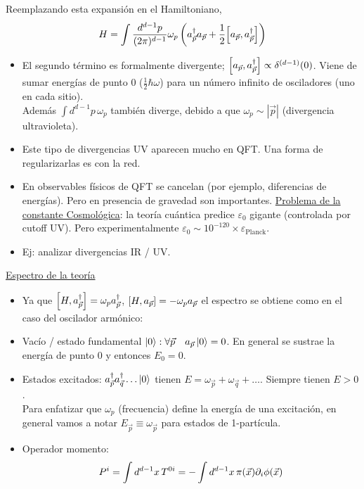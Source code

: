 Reemplazando esta expansión en el Hamiltoniano,
$$ H = \int \frac{d^{d-1}p}{(2\pi)^{d-1}} \omega_p \left( a_{\vec{p}}^\dagger a_{\vec{p}} + \frac{1}{2} \comm{a_{\vec{p}}}{a_{\vec{p}}^\dagger} \right) $$
\begin{itemize}
    \item El segundo término es formalmente divergente; $\comm{a_{\vec{p}}}{a_{\vec{p}}^\dagger} \propto \delta^{(d-1)}(0)$. Viene de sumar energías de punto 0 ($\frac{1}{2}\hbar\omega$) para un número infinito de osciladores (uno en cada sitio).\\
          Además $\int d^{d-1}p \, \omega_p$ también diverge, debido a que $\omega_p \sim |\vec{p}|$ (divergencia ultravioleta).
    \item[*] Este tipo de divergencias UV aparecen mucho en QFT. Una forma de regularizarlas es con la red.
    \item En observables físicos de QFT se cancelan (por ejemplo, diferencias de energías). Pero en presencia de gravedad son importantes. \underline{Problema de la constante Cosmológica}: la teoría cuántica predice $\varepsilon_0$ gigante (controlada por cutoff UV). Pero experimentalmente $\varepsilon_0 \sim 10^{-120} \times \varepsilon_{\text{Planck}}$.
    \item Ej: analizar divergencias IR / UV.
\end{itemize}

\vspace{0.5cm}
\noindent \underline{Espectro de la teoría}
\begin{itemize}
    \item Ya que $\comm{H}{a_{\vec{p}}^\dagger} = \omega_p a_{\vec{p}}^\dagger$, $\comm{H}{a_{\vec{p}}} = -\omega_p a_{\vec{p}}$ el espectro se obtiene como en el caso del oscilador armónico:
    \item[—] Vacío / estado fundamental $\ket{0} :\forall \vec{p}\quad a_{\vec{p}}\ket{0} = 0$. En general se sustrae la energía de punto 0 y entonces $E_0 = 0$.
    \item[—] Estados excitados: $a_{\vec{p}}^\dagger a_{\vec{q}}^\dagger \dots \ket{0}$ tienen $E = \omega_{\vec{p}} + \omega_{\vec{q}} + \dots$. Siempre tienen $E > 0$.\\
        Para enfatizar que $\omega_p$ (frecuencia) define la energía de una excitación, en general vamos a notar $E_{\vec{p}} \equiv \omega_{\vec{p}}$ para estados de 1-partícula.
    \item Operador momento:
          $$ P^i = \int d^{d-1}x \, T^{0i} = -\int d^{d-1}x \, \pi(\vec{x}) \partial_i \phi(\vec{x}) $$
\end{itemize}

